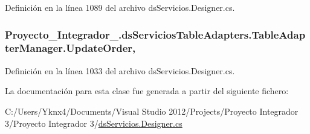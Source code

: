 Definición en la línea 1089 del archivo ds\-Servicios.\-Designer.\-cs.

\hypertarget{class_proyecto___integrador__3_1_1ds_servicios_table_adapters_1_1_table_adapter_manager_a091630e6863de7670f950252387391a2}{
\subsubsection[{Update\-Order}]{ Proyecto\-\_\-\-Integrador\-\_.\-ds\-Servicios\-Table\-Adapters.\-Table\-Adapter\-Manager.\-Update\-Order\hspace{0.3cm}{\ttfamily [get]}, {\ttfamily [set]}}}\label{class_proyecto___integrador__3_1_1ds_servicios_table_adapters_1_1_table_adapter_manager_a091630e6863de7670f950252387391a2}


Definición en la línea 1033 del archivo ds\-Servicios.\-Designer.\-cs.



La documentación para esta clase fue generada a partir del siguiente fichero\-:\begin{DoxyCompactItemize}
\item 
C\-:/\-Users/\-Yknx4/\-Documents/\-Visual Studio 2012/\-Projects/\-Proyecto Integrador 3/\-Proyecto Integrador 3/\hyperlink{ds_servicios_8_designer_8cs}{ds\-Servicios.\-Designer.\-cs}\end{DoxyCompactItemize}
